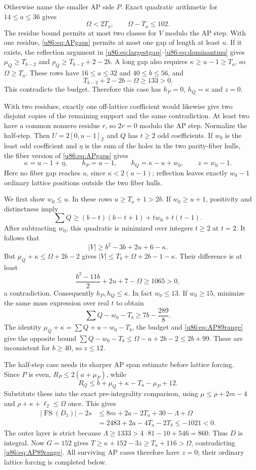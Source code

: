 \documentclass[11pt,a4paper]{article}
\theoremstyle{remark}
\newcommand{\FS}{\operatorname{FS}}
\newcommand{\Z}{\mathbb Z}
\begin{document}
Otherwise name the smaller AP side $P$. Exact quadratic arithmetic for
$14\le a\le36$ gives
\begin{equation}\label{u86:eq:AP89range}
 \Omega<2T_a,\qquad \Omega-T_a\le102.
\end{equation}
The residue bound permits at most two classes for $V$ modulo the AP
step. With one residue, \eqref{u86:eq:APgaps} permits at most one gap of
length at least $u$. If it exists, the reflection argument in
\eqref{u86:eq:largestgap}--\eqref{u86:eq:dominantmu} gives
$\mu_Q\ge T_{b-2}$ and $\rho_Q\ge T_{b-2}+2-2b$.
A long gap also requires $\kappa\ge u-1\ge T_a$, so $\Omega\ge T_a$.
These rows have $16\le a\le32$ and $40\le b\le56$, and
\[
 T_{b-2}+2-2b-\Omega\ge133>0.
\]
This contradicts the budget. Therefore this case has $h_P=0$,
$h_Q=\kappa$ and $z=0$.

With two residues, exactly one off-lattice coefficient would likewise
give two disjoint copies of the remaining support and the same
contradiction. At least two have a common nonzero residue $r$, so
$2r=0$ modulo the AP step. Normalize the half-step. Then
$U=2[0,u-1]_{\Z}$ and $Q$ has $t\ge2$ odd coefficients. If $w_0$ is
the least odd coefficient and $\eta$ is the sum of the holes in the two
parity-fiber hulls, the fiber version of \eqref{u86:eq:APgaps} gives
\[
 \kappa=u-1+\eta,\qquad h_P=u-1,
 \qquad h_Q=\kappa-u+w_0,\qquad z=w_0-1.
\]
Here no fiber gap reaches $u$, since $\kappa<2(u-1)$; reflection leaves
exactly $w_0-1$ ordinary lattice positions outside the two fiber hulls.

We first show $w_0\le u$. In these rows $u\ge T_a+1>2b$.
If $w_0\ge u+1$, positivity and distinctness imply
\[
 \sum Q\ge(b-t)(b-t+1)+t w_0+t(t-1).
\]
After subtracting $w_0$, this quadratic is minimized over integers
$t\ge2$ at $t=2$. It follows that
\[
 |V|\ge b^2-3b+2u+6-\kappa.
\]
But $\mu_Q+\kappa\le\Omega+2b-2$ gives
$|V|\le T_b+\Omega+2b-1-\kappa$. Their difference is at least
\[
 \frac{b^2-11b}{2}+2u+7-\Omega\ge1065>0,
\]
a contradiction. Consequently $h_P,h_Q\le\kappa$.
In fact $w_0\le13$. If $w_0\ge15$, minimize the same mass expression
over real $t$ to obtain
\[
 \sum Q-w_0-T_b\ge7b-\frac{289}{8}.
\]
The identity $\mu_Q+\kappa=\sum Q+u-w_0-T_b$, the budget and
\eqref{u86:eq:AP89range} give the opposite bound
$\sum Q-w_0-T_b\le\Omega-u+2b-2\le2b+99$.
These are inconsistent for $b\ge40$, so $z\le12$.

The half-step case needs its sharper AP span estimate before lattice
forcing. Since $P$ is even, $R_P\le2(a+\mu_P)$, while
\[
 R_Q\le b+\mu_Q+\kappa-T_a-\mu_P+12.
\]
Substitute these into the exact pre-integrality comparison, using
$\mu\le\rho+2m-4$ and $\rho+\kappa+\ell_2\le\Omega$ once. This gives
\begin{align*}
 |\FS(D_1)|-2s
 &\le8m+2a-2T_a+30-\Lambda+\Omega\\
 &=2483+2a-4T_a-2T_b\le-1021<0.
\end{align*}
The outer layer is strict because
$\Lambda\ge1333>4\cdot81-10+546=860$. Thus $D$ is integral.
Now $G=152$ gives $T\ge\kappa+152-3z\ge T_a+116>\Omega$,
contradicting \eqref{u86:eq:AP89range}. All surviving AP cases therefore
have $z=0$; their ordinary lattice forcing is completed below.
\end{document}
